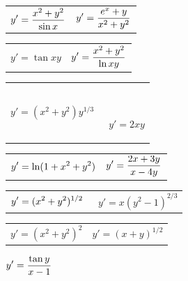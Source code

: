 \begin{exerciselist}
  \begin{tabular}[t]{@{}p{168pt}@{}p{168pt}}
    \item\label{exer:2.3.1} $\displaystyle{y'=\frac{x^{2}+y^{2}}{\sin x}}$ &
    \item\label{exer:2.3.2}\vspace*{10pt} $\displaystyle{y'=\frac{e^{x}+y}{x^{2}+y^{2}}}$
  \end{tabular}

  \begin{tabular}[t]{@{}p{168pt}@{}p{168pt}}
    \item\label{exer:2.3.3} $y'=\tan xy$ &
    \item\label{exer:2.3.4} $\displaystyle{y'=\frac{x^{2}+y^{2}}{\ln xy}}$
  \end{tabular}

  \begin{tabular}[t]{@{}p{168pt}@{}p{168pt}}
    \item\label{exer:2.3.5} $y'= (x^{2}+y^{2})y^{1/3}$ & \
    \item\label{exer:2.3.6} \ $y'=2xy$
  \end{tabular}

  \begin{tabular}[t]{@{}p{168pt}@{}p{168pt}}
    \vspace*{10pt}
    \item\label{exer:2.3.7} $\displaystyle{y'=\ln(1+x^{2}+y^{2})}$ & \vspace*{4pt}
    \item\label{exer:2.3.8} $\displaystyle{y'=\frac{2x+3y}{x-4y}}$
  \end{tabular}

  \begin{tabular}[t]{@{}p{168pt}@{}p{168pt}}
    \item\label{exer:2.3.9} $\displaystyle{y'=(x^{2}+y^{2})^{1/2}}$ &
    \item\label{exer:2.3.10}\  $y'= x(y^{2}-1)^{2/3}$
  \end{tabular}

  \begin{tabular}[t]{@{}p{168pt}@{}p{168pt}}
    \item\label{exer:2.3.11} $y'=(x^{2}+y^{2})^{2}$ &
    \item\label{exer:2.3.12} $y'=(x+y)^{1/2}$
  \end{tabular}

  \item\label{exer:2.3.13} $\displaystyle{y'=\frac{\tan y}{x-1}}$


\end{exerciselist}

